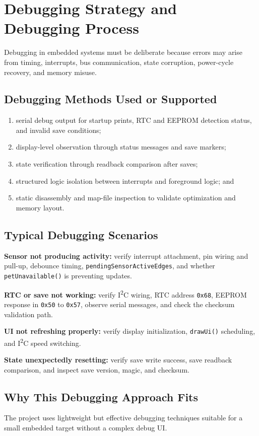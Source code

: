 \documentclass[conference]{IEEEtran}
\begin{document}
\section{Debugging Strategy and Debugging Process}
Debugging in embedded systems must be deliberate because errors may arise from timing, interrupts, bus communication, state corruption, power-cycle recovery, and memory misuse.

\subsection{Debugging Methods Used or Supported}
\begin{enumerate}
\item serial debug output for startup prints, RTC and EEPROM detection status, and invalid save conditions;
\item display-level observation through status messages and save markers;
\item state verification through readback comparison after saves;
\item structured logic isolation between interrupts and foreground logic; and
\item static disassembly and map-file inspection to validate optimization and memory layout.
\end{enumerate}

\subsection{Typical Debugging Scenarios}
\textbf{Sensor not producing activity:} verify interrupt attachment, pin wiring and pull-up, debounce timing, \texttt{pendingSensorActiveEdges}, and whether \texttt{petUnavailable()} is preventing updates.

\textbf{RTC or save not working:} verify I\textsuperscript{2}C wiring, RTC address \texttt{0x68}, EEPROM response in \texttt{0x50} to \texttt{0x57}, observe serial messages, and check the checksum validation path.

\textbf{UI not refreshing properly:} verify display initialization, \texttt{drawUi()} scheduling, and I\textsuperscript{2}C speed switching.

\textbf{State unexpectedly resetting:} verify save write success, save readback comparison, and inspect save version, magic, and checksum.

\subsection{Why This Debugging Approach Fits}
The project uses lightweight but effective debugging techniques suitable for a small embedded target without a complex debug UI.
\end{document}
